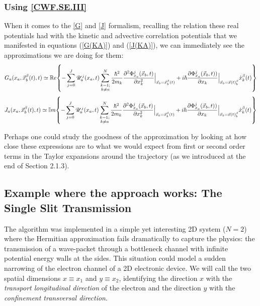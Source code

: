 \documentclass[11pt, a4paper]{article} %
\newcommand{\R}{\mathbb{R}} %
\newcommand{\U}{\mathscr{U}}
\begin{document}
\subsubsection{Using \ref{CWF.SE.III}}
When it comes to the \ref{G} and \ref{J} formalism, recalling the relation these real potentials had with the kinetic and advective correlation potentials that we manifested in equations (\ref{G(KA)}) and (\ref{J(KA)}), we can immediately see the approximations we are doing for them:
$$
G_a(x_a,\vec{x}_b^\beta(t),t)\simeq \R e \qty{ - \sum_{j=0}^J  \U^j_a(x_a,t) \sum_{\substack{k=1; \\ k\neq a}}^{N}  \frac{\hbar^2}{2m_k} \pdv[2]{ \Phi_{x_a}^j(\vec{x}_b,t)}{x_k}\Big\rvert_{\vec{x}_b=\vec{x}_b^\beta(t)} +  i \hbar \pdv{ \Phi_{x_a}^j(\vec{x}_b,t))}{x_k}\Big\rvert_{\vec{x}_b=\vec{x}(t)_b^\beta} \dot{x}_k^\beta(t)}
$$
$$
J_a(x_a,\vec{x}_b^\beta(t),t)\simeq \mathbb{I} m \qty{ - \sum_{j=0}^J  \U^j_a(x_a,t) \sum_{\substack{k=1; \\ k\neq a}}^{N}  \frac{\hbar^2}{2m_k} \pdv[2]{ \Phi_{x_a}^j(\vec{x}_b,t)}{x_k}\Big\rvert_{\vec{x}_b=\vec{x}_b^\beta(t)} +  i \hbar \pdv{ \Phi_{x_a}^j(\vec{x}_b,t))}{x_k}\Big\rvert_{\vec{x}_b=\vec{x}(t)_b^\beta} \dot{x}_k^\beta(t)}
$$

Perhaps one could study the goodness of the approximation by looking at how close these expressions are to what we would expect from first or second order terms in the Taylor expansions around the trajectory (as we introduced at the end of Section 2.1.3).


\subsection{Example where the approach works: The Single Slit Transmission}
The algorithm was implemented in a simple yet interesting 2D system ($N=2$) where the Hermitian approximation fails dramatically to capture the physics: the transmission of a wave-packet through a bottleneck channel with infinite potential energy walls at the sides. This situation could model a sudden narrowing of the electron channel of a 2D electronic device. We will call the two spatial dimensions $x\equiv x_1$ and $y\equiv x_2$, identifying the direction $x$ with the {\em transport longitudinal direction} of the electron and the direction $y$ with the {\em confinement transversal direction}.

\end{document}
